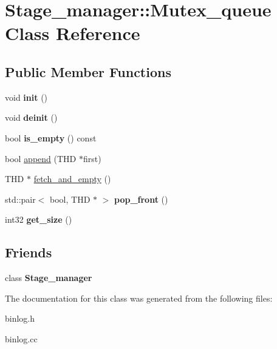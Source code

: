 \hypertarget{classStage__manager_1_1Mutex__queue}{}\section{Stage\+\_\+manager\+:\+:Mutex\+\_\+queue Class Reference}
\label{classStage__manager_1_1Mutex__queue}
\subsection*{Public Member Functions}
\begin{DoxyCompactItemize}
\item 
\mbox{\label{classStage__manager_1_1Mutex__queue_a571aec4a56d11f2a0830fc3c25c85f4a}} 
void {\bfseries init} ()
\item 
\mbox{\label{classStage__manager_1_1Mutex__queue_a131b7d6a647809057ec08fa9ce071670}} 
void {\bfseries deinit} ()
\item 
\mbox{\label{classStage__manager_1_1Mutex__queue_a38b3bc5c06a8e0c22bc984c6892df460}} 
bool {\bfseries is\+\_\+empty} () const
\item 
bool \mbox{\hyperlink{group__Binary__Log_ga20a543666e684f08da1cc093d5fa70ec}{append}} (T\+HD $\ast$first)
\item 
T\+HD $\ast$ \mbox{\hyperlink{group__Binary__Log_ga254675ae9d8f6f0a7b48d7520ab16eea}{fetch\+\_\+and\+\_\+empty}} ()
\item 
std\+::pair$<$ bool, T\+HD $\ast$ $>$ {\bfseries pop\+\_\+front} ()
\item 
\mbox{\label{classStage__manager_1_1Mutex__queue_af0a82edab2372b106626da17c0450177}} 
int32 {\bfseries get\+\_\+size} ()
\end{DoxyCompactItemize}
\subsection*{Friends}
\begin{DoxyCompactItemize}
\item 
\mbox{\label{classStage__manager_1_1Mutex__queue_a00c51fe956dade87d2f37e002945236f}} 
class {\bfseries Stage\+\_\+manager}
\end{DoxyCompactItemize}


The documentation for this class was generated from the following files\+:\begin{DoxyCompactItemize}
\item 
binlog.\+h\item 
binlog.\+cc\end{DoxyCompactItemize}
